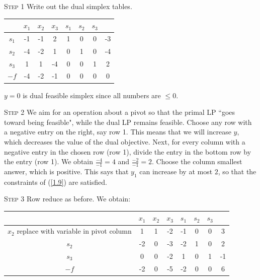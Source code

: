 \newpage
\begin{procedure}
    \textcolor{MarkerColour}{\textsc{Step 1}} Write out the dual simplex tables.
    \begin{table}[H]
        \centering
        \begin{tabular}{|c|cccccc|c|}
        \hline
        & $x_1$ & $x_2$ & $x_3$ & $s_1$ & $s_2$ & $s_3$  & \\ \hline
        $s_1$ &-1 & -1 & 2& 1 & 0 & 0& -3 \\
        $s_2$ &-4 & -2 & 1 & 0 & 1 & 0 & -4\\
        $s_3$ &1 & 1& -4 & 0 & 0 & 1 &  2\\ \hline
        $-f$ & -4 & -2 & -1 & 0& 0& 0 & 0\\ \hline
        \end{tabular}
        \label{tab-2}
    \end{table}
    $y = 0$ is dual feasible simplex since all numbers are $\le 0.$

    \noindent\textcolor{MarkerColour}{\textsc{Step 2}} We aim for an operation about a pivot so that the primal LP ``goes toward being feasible", while the dual LP remains feasible. Choose any row with a negative entry on the right, say row 1. This means that we will increase $y$, which decreases the value of the dual objective. Next, for every column with a negative entry in the chosen row (row 1), divide the entry in the bottom row by the entry (row 1). We obtain $\frac{-4}{-1} = 4$ and $\frac{-2}{-1} = 2$. Choose the column smallest answer, which is positive. This says that $y_1$ can increase by at most $2$, so that the constraints of (\ref{1.9}) are satisfied.

    \noindent\textcolor{MarkerColour}{\textsc{Step 3}} Row reduce as before. We obtain:
    \begin{table}[H]
        \centering
        \begin{tabular}{|c|cccccc|c|}
        \hline
        & $x_1$ & $x_2$ & $x_3$ & $s_1$ & $s_2$ & $s_3$ &  \\ \hline
        $x_2$ \textcolor{SwishLineColour}{replace with variable in pivot column} &1 & 1 & -2 & -1 & 0 & 0  & 3 \\
        $s_2$ &-2 & 0 & -3 & -2 & 1 & 0 & 2\\
        $s_3$ &0 & 0& -2 & 1 & 0 & 1 & -1\\ \hline
        $-f$ & -2 & 0 & -5 & -2 & 0 & 0 & 6 \\ \hline
        \end{tabular}
        \label{tab-3}
    \end{table}


\end{procedure}
